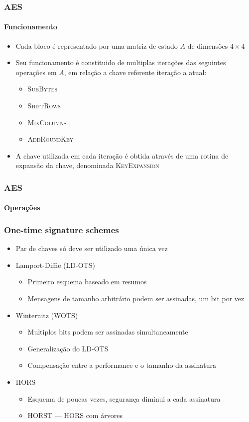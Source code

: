 \documentclass[12pt]{beamer}
\begin{document}
\begin{frame}
    \frametitle{AES}
    \framesubtitle{Funcionamento}
    \begin{itemize}
        \item Cada bloco é representado por uma matriz de estado $A$ de dimensões $4 \times 4$
        \item Seu funcionamento é constituido de multiplas iterações das seguintes operações em $A$, em relação a chave referente iteração a atual:
        \begin{itemize}
            \item\textsc{SubBytes}
            \item\textsc{ShiftRows}
            \item\textsc{MixColumns}
            \item\textsc{AddRoundKey}
        \end{itemize}
        \item A chave utilizada em cada iteração é obtida através de uma rotina de expansão da chave, denominada \textsc{KeyExpansion}
    \end{itemize}
\end{frame}

\begin{frame}
    \frametitle{AES}
    \framesubtitle{Operações}
    
\end{frame}

\begin{frame}
  \frametitle{One-time signature schemes}
  \begin{itemize}
    \item Par de chaves só deve ser utilizado uma única vez
    \item Lamport-Diffie (LD-OTS)
    \begin{itemize}
      \item Primeiro esquema baseado em resumos
      \item Mensagens de tamanho arbitrário podem ser assinadas, um bit por vez
    \end{itemize}
    \item Winternitz (WOTS)
    \begin{itemize}
      \item Multiplos bits podem ser assinadas simultaneamente
      \item Generalização do LD-OTS
      \item Compensação entre a performance e o tamanho da assinatura
    \end{itemize}
    \item HORS
    \begin{itemize}
      \item Esquema de poucas vezes, segurança diminui a cada assinatura
      \item HORST --- HORS com árvores
    \end{itemize}
  \end{itemize}
\end{frame}
\end{document}
